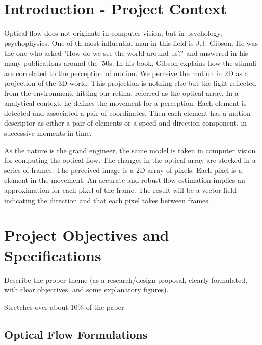\documentclass[12pt,a4paper,twoside]{report}
\begin{document}
\newpage

\tableofcontents
\newpage



\chapter{Introduction - Project Context}
\pagestyle{headings}
{\color{red}{must be about 3 pages}}

Optical flow does not originate in computer vision, but in psychology, psychophysics. One of th most influential man in this field is J.J. Gibson. He was the one who asked "How do we see the world around us?" and answered in his many publications around the '50s. In his book\cite{gibson1950perception}, Gibson explains how the stimuli are correlated to the perception of motion. 
We perceive the motion in 2D as a projection of the 3D world. This projection is nothing else but the light reflected from the environment, hitting our retina, referred as the optical array. In a analytical context, he defines the movement for a perception. Each element is detected and associated a pair of coordinates. Then each element has a motion descriptor as either a pair of elements or a speed and direction component, in successive moments in time. 

As the nature is the grand engineer, the same model is taken in computer vision for computing the optical flow. The changes in the optical array are stocked in a series of frames. The perceived image is a 2D array of pixels. Each pixel is a element in the movement. An accurate and robust flow estimation implies an approximation for each pixel of the frame. The result will be a vector field indicating the direction and that each pixel takes between frames.
 






\chapter{Project Objectives and Specifications}
{\color{red}{must be about 6 pages}}

Describe the proper theme (as a research/design proposal, clearly formulated, with clear objectives, and some explanatory figures).

Stretches over about 10\% of the paper.

\section{Optical Flow Formulations}
\end{document}
